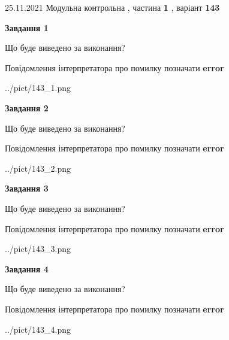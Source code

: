 \documentclass[10pt, ukrainian]{article}
\begin{document}
{25.11.2021 Модульна контрольна , частина \textbf { 1 }, варіант  \No \textbf { 143 }\par}
{
\begin {large}

{\begin {center}\textbf{Завдання 1}\end {center}}\par
Що буде виведено за виконання? \par
Повідомлення інтерпретатора про помилку позначати \textbf{error}

\begin{center}
	{../pict/143_1.png}
\end{center}
\newpage

{\begin {center}\textbf{Завдання 2}\end {center}}\par
Що буде виведено за виконання? \par
Повідомлення інтерпретатора про помилку позначати \textbf{error}

\begin{center}
	{../pict/143_2.png}
\end{center}
\newpage

{\begin {center}\textbf{Завдання 3}\end {center}}\par
Що буде виведено за виконання? \par
Повідомлення інтерпретатора про помилку позначати \textbf{error}

\begin{center}
	{../pict/143_3.png}
\end{center}
\newpage

{\begin {center}\textbf{Завдання 4}\end {center}}\par
Що буде виведено за виконання? \par
Повідомлення інтерпретатора про помилку позначати \textbf{error}

\begin{center}
	{../pict/143_4.png}
\end{center}
\newpage


\end{large}}
\end{document}
